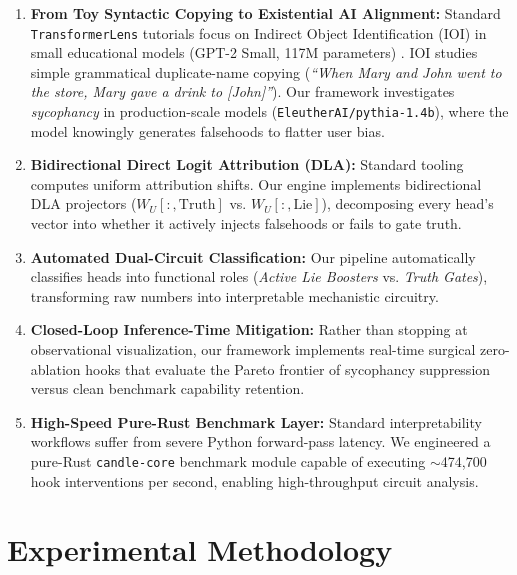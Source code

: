 \documentclass[11pt,a4paper]{article}
\begin{document}
\begin{enumerate}[leftmargin=*]
    \item \textbf{From Toy Syntactic Copying to Existential AI Alignment:} Standard \texttt{TransformerLens} tutorials focus on Indirect Object Identification (IOI) in small educational models (GPT-2 Small, 117M parameters) \cite{wang2022interpretability}. IOI studies simple grammatical duplicate-name copying (\textit{``When Mary and John went to the store, Mary gave a drink to [John]''}). Our framework investigates \textit{sycophancy} in production-scale models (\texttt{EleutherAI/pythia-1.4b}), where the model knowingly generates falsehoods to flatter user bias.
    \item \textbf{Bidirectional Direct Logit Attribution (DLA):} Standard tooling computes uniform attribution shifts. Our engine implements bidirectional DLA projectors ($W_U[:, \text{Truth}]$ vs. $W_U[:, \text{Lie}]$), decomposing every head's vector into whether it actively injects falsehoods or fails to gate truth.
    \item \textbf{Automated Dual-Circuit Classification:} Our pipeline automatically classifies heads into functional roles (\textit{Active Lie Boosters} vs. \textit{Truth Gates}), transforming raw numbers into interpretable mechanistic circuitry.
    \item \textbf{Closed-Loop Inference-Time Mitigation:} Rather than stopping at observational visualization, our framework implements real-time surgical zero-ablation hooks that evaluate the Pareto frontier of sycophancy suppression versus clean benchmark capability retention.
    \item \textbf{High-Speed Pure-Rust Benchmark Layer:} Standard interpretability workflows suffer from severe Python forward-pass latency. We engineered a pure-Rust \texttt{candle-core} benchmark module capable of executing $\sim$474,700 hook interventions per second, enabling high-throughput circuit analysis.
\end{enumerate}

\section{Experimental Methodology}
\label{sec:methodology}
\end{document}
